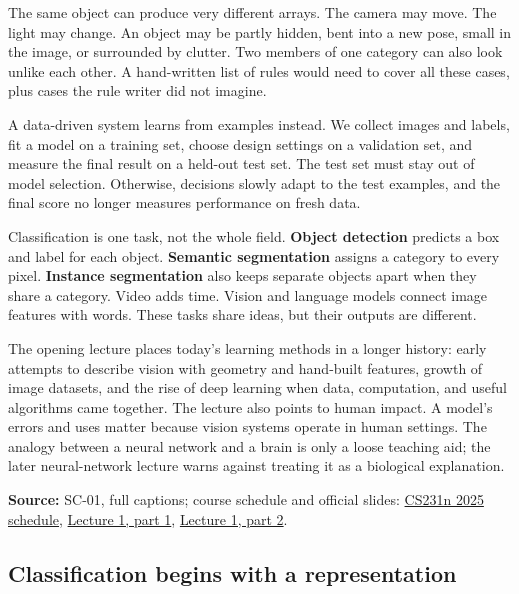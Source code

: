 The same object can produce very different arrays. The camera may move. The light may change. An object may be partly hidden, bent into a new pose, small in the image, or surrounded by clutter. Two members of one category can also look unlike each other. A hand-written list of rules would need to cover all these cases, plus cases the rule writer did not imagine.

A data-driven system learns from examples instead. We collect images and labels, fit a model on a training set, choose design settings on a validation set, and measure the final result on a held-out test set. The test set must stay out of model selection. Otherwise, decisions slowly adapt to the test examples, and the final score no longer measures performance on fresh data.

Classification is one task, not the whole field. \textbf{Object detection} predicts a box and label for each object. \textbf{Semantic segmentation} assigns a category to every pixel. \textbf{Instance segmentation} also keeps separate objects apart when they share a category. Video adds time. Vision and language models connect image features with words. These tasks share ideas, but their outputs are different.

The opening lecture places today's learning methods in a longer history: early attempts to describe vision with geometry and hand-built features, growth of image datasets, and the rise of deep learning when data, computation, and useful algorithms came together. The lecture also points to human impact. A model's errors and uses matter because vision systems operate in human settings. The analogy between a neural network and a brain is only a loose teaching aid; the later neural-network lecture warns against treating it as a biological explanation.

\textbf{Source:} SC-01, full captions; course schedule and official slides: \href{https://cs231n.stanford.edu/2025/schedule.html}{CS231n 2025 schedule}, \href{https://cs231n.stanford.edu/slides/2025/lecture_1_part_1.pdf}{Lecture 1, part 1}, \href{https://cs231n.stanford.edu/slides/2025/lecture_1_part_2.pdf}{Lecture 1, part 2}.

\subsection{Classification begins with a representation}\label{04-visual-computing-ii-ch031-classification-begins-with-a-representation}

\hypertarget{04-visual-computing-ii-ch031-classification-begins-with-a-representation}{}

